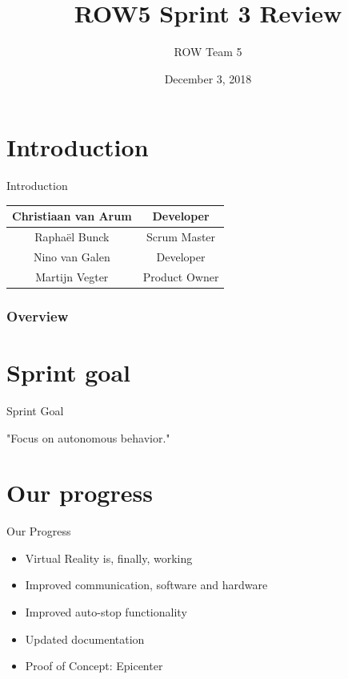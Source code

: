 \documentclass{beamer}
\title[Sprint Review]{ROW5 Sprint 3 Review}
\author{ROW Team 5}
\institute[HvA]
{
	Amsterdam University of Applied Sciences \\
	\textit{https://rescueonwheels.github.io/}
}
\date{December 3, 2018}
\begin{document}
\begin{frame}
\titlepage %
\end{frame}

\section{Introduction}
\begin{frame}{Introduction}
    \begin{center}
        \begin{tabular}{c|c}
             Christiaan van Arum & Developer \\
             \hline
             Rapha\"{e}l Bunck & Scrum Master \\
             \hline
             Nino van Galen & Developer \\
             \hline
             Martijn Vegter & Product Owner
         \end{tabular}
    \end{center}
\end{frame}

\begin{frame}
\frametitle{Overview} %
\tableofcontents %
\end{frame}

\section{Sprint goal}
\begin{frame}{Sprint Goal}
\normalsize{\centerline{"Focus on autonomous behavior."}}
\end{frame}

\section{Our progress}
\begin{frame}{Our Progress}
    \begin{itemize}
    \item Virtual Reality is, finally, working
    \item Improved communication, software and hardware
    \item Improved auto-stop functionality
    \item Updated documentation
    \item Proof of Concept: Epicenter
\end{itemize}
\end{frame}
\end{document}
